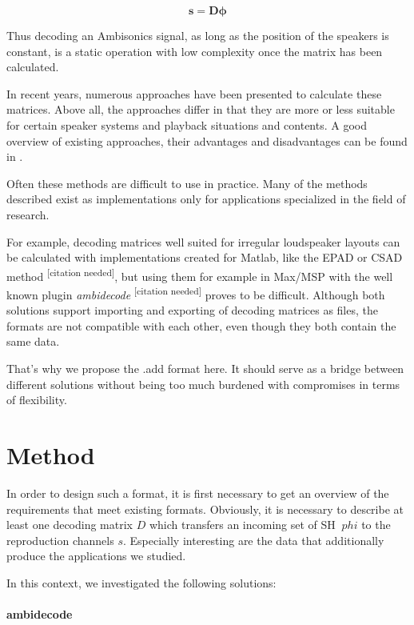 \documentclass[a4paper, 10pt, twocolumn]{article}
\newcommand{\citationneeded}[1][]{\textsuperscript{\color{black} [citation needed]}}
\begin{document}
\begin{equation}
    \boldsymbol{s}=\boldsymbol{D} \boldsymbol{\phi}
\end{equation}

Thus decoding an Ambisonics signal, as long as the position of the speakers is constant, is a static operation with low complexity once the matrix has been calculated.

In recent years, numerous approaches have been presented to calculate these matrices. Above all, the approaches differ in that they are more or less suitable for certain speaker systems and playback situations and contents. A good overview of existing approaches, their advantages and disadvantages can be found in \cite{allradepadcomp} \cite{unstablemmd} \cite{allrad} \cite{csad} \cite{epad}.

Often these methods are difficult to use in practice. Many of the methods described exist as implementations only for applications specialized in the field of research. 

For example, decoding matrices well suited for irregular loudspeaker layouts can be calculated with implementations created for Matlab, like the EPAD \cite{epad} or CSAD \cite{csad} method \citationneeded{}, but using them for example in Max/MSP with the well known plugin \textit{ambidecode\texttildelow} \citationneeded{} proves to be difficult. Although both solutions support importing and exporting of decoding matrices as files, the formats are not compatible with each other, even though they both contain the same data.

That's why we propose the .add format here. It should serve as a bridge between different solutions without being too much burdened with compromises in terms of flexibility.

\section{Method} \label{sec:Method}

In order to design such a format, it is first necessary to get an overview of the requirements that meet existing formats. Obviously, it is necessary to describe at least one decoding matrix $ D $ which transfers an incoming set of SH $ \ phi $ to the reproduction channels $ s $. Especially interesting are the data that additionally produce the applications we studied.

In this context, we investigated the following solutions:

\paragraph{ambidecode\texttildelow}
\end{document}
